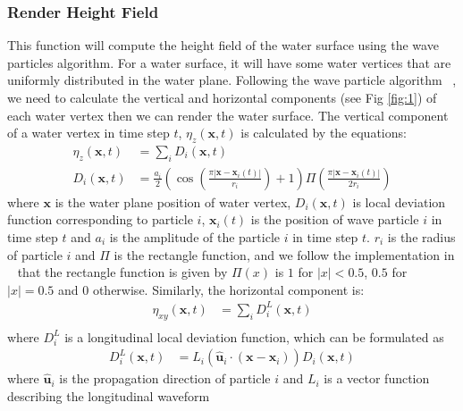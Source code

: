\documentclass[acmtog]{acmart}
\begin{document}
\subsubsection{Render Height Field}
This function will compute the height field of the water surface using the wave particles algorithm. For a water surface, it will have some water vertices that are uniformly distributed in the water plane. Following the wave particle algorithm ~\cite{yuksel2007wave}, we need to calculate the vertical and horizontal components (see Fig \ref{fig:1}) of each water vertex then we can render the water surface. The vertical component of a water vertex in time step $t$, $\eta_{z}(\mathbf{x},t)$ is calculated by the equations:
\begin{equation*}
   \begin{aligned}
        \eta_{z}(\mathbf{x},t) &= \sum_{i}D_i(\mathbf{x},t) \\
        D_i(\mathbf{x},t) &= \frac{a_i}{2}\left( \cos \left( \frac{\pi |\mathbf{x}-\mathbf{x}_i(t)|}{r_i}\right)+1\right)\Pi\left(\frac{\pi |\mathbf{x}-\mathbf{x}_i(t)|}{2r_i}\right)
    \end{aligned}
\end{equation*}
where $\mathbf{x}$ is the water plane position of water vertex, $D_i(\mathbf{x},t)$ is local deviation function corresponding to particle $i$, $\mathbf{x}_i(t)$ is the position of wave particle $i$ in time step $t$ and $a_{i}$ is the amplitude of the particle $i$ in time step $t$. 
$r_{i}$ is the radius of particle $i$ and $\Pi$ is the rectangle function, and we follow the implementation in ~\cite{yuksel2007wave} that the rectangle function is given by $\Pi(x)$ is $1$ for $|x| < 0.5$, $0.5$ for $|x|=0.5$ and $0$ otherwise.
Similarly, the horizontal component is:
\begin{equation*}
   \begin{aligned}
        \eta_{xy}(\mathbf{x},t) &= \sum_{i}D^L_i(\mathbf{x},t) \\
    \end{aligned}
\end{equation*}
where $D^L_i$ is a longitudinal local deviation function, which can be formulated as
\begin{equation*}
   \begin{aligned}
        D^L_i(\mathbf{x},t) &= L_i(\hat{\mathbf{u}}_i\cdot(\mathbf{x}-\mathbf{x}_i))D_i(\mathbf{x},t)
    \end{aligned}
\end{equation*}
where $\hat{\mathbf{u}}_i$ is the propagation direction of particle $i$ and $L_i$ is a vector function describing the longitudinal waveform
\end{document}

